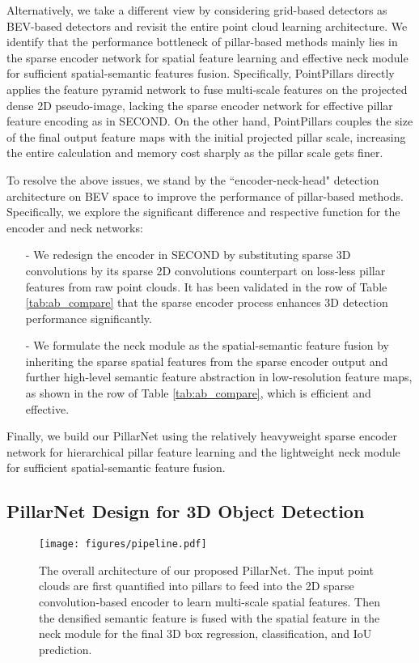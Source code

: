 \documentclass[runningheads]{llncs}
\begin{document}
Alternatively, we take a different view by considering grid-based detectors as BEV-based detectors and revisit the entire point cloud learning architecture.  
We identify that the performance bottleneck of pillar-based methods mainly lies in the sparse encoder network for spatial feature learning and effective neck module for sufficient spatial-semantic features fusion.
Specifically, PointPillars directly applies the feature pyramid network to fuse multi-scale features on the projected dense 2D pseudo-image, lacking the sparse encoder network for effective pillar feature encoding as in SECOND.
On the other hand, PointPillars couples the size of the final output feature maps with the initial projected pillar scale, increasing the entire calculation and memory cost sharply as the pillar scale gets finer.

To resolve the above issues, we stand by the ``encoder-neck-head" detection architecture on BEV space to improve the performance of pillar-based methods.
Specifically, we explore the significant difference and respective function for the encoder and neck networks:
\begin{enumerate}
\item[-] We redesign the encoder in SECOND by substituting sparse 3D convolutions by its sparse 2D convolutions counterpart on loss-less pillar features from raw point clouds. It has been validated in the  row of Table \ref{tab:ab_compare} that the sparse encoder process enhances 3D detection performance significantly.
\item[-] We formulate the neck module as the spatial-semantic feature fusion by inheriting the sparse spatial features from the sparse encoder output and further high-level semantic feature abstraction in low-resolution feature maps, as shown in the  row of Table \ref{tab:ab_compare}, which is efficient and effective.
\end{enumerate}
Finally, we build our PillarNet using the relatively heavyweight sparse encoder network for hierarchical pillar feature learning and the lightweight neck module for sufficient spatial-semantic feature fusion.


\subsection{PillarNet Design for 3D Object Detection}

\begin{figure}
\centering
\texttt{[image: figures/pipeline.pdf]}
\caption{The overall architecture of our proposed PillarNet. The input point clouds are first quantified into pillars to feed into the 2D sparse convolution-based encoder to learn multi-scale spatial features. Then the densified semantic feature is fused with the spatial feature in the neck module for the final 3D box regression, classification, and IoU prediction.}
\label{fig:pipeline}
\end{figure}
\end{document}
